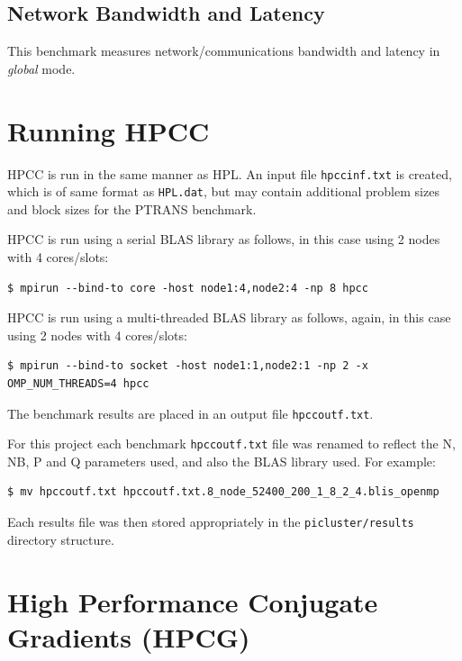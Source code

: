 \documentclass{report}
\begin{document}
%
%
\subsection{Network Bandwidth and Latency}

This benchmark measures network/communications bandwidth and latency in \emph{global} mode.


%
%
\section{Running HPCC}

HPCC is run in the same manner as HPL. An input file \verb|hpccinf.txt| is created, which is of same format as \verb|HPL.dat|, but may contain additional problem sizes and block sizes for the PTRANS benchmark.

HPCC is run using a serial BLAS library as follows, in this case using 2 nodes with 4 cores/slots:

\lstset{style=type}
\begin{lstlisting}
$ mpirun --bind-to core -host node1:4,node2:4 -np 8 hpcc
\end{lstlisting}

HPCC is run using a multi-threaded BLAS library as follows, again, in this case using 2 nodes with 4 cores/slots:

\lstset{style=type}
\begin{lstlisting}
$ mpirun --bind-to socket -host node1:1,node2:1 -np 2 -x OMP_NUM_THREADS=4 hpcc
\end{lstlisting}

The benchmark results are placed in an output file \verb|hpccoutf.txt|.  

For this project each benchmark \verb|hpccoutf.txt| file was renamed to reflect the N, NB, P and Q parameters used, and also the BLAS library used. For example:

\lstset{style=type}
\begin{lstlisting}
$ mv hpccoutf.txt hpccoutf.txt.8_node_52400_200_1_8_2_4.blis_openmp
\end{lstlisting}

Each results file was then stored appropriately in the \verb|picluster/results| directory structure. 


%
%
\section{High Performance Conjugate Gradients (HPCG)}
\end{document}
